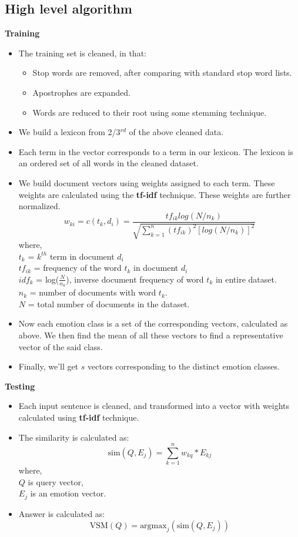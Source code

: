 \subsection{High level algorithm}
\label{subsec-high-level-alg}
\textbf{Training}
\begin{itemize}
\item The training set is cleaned, in that:
	\begin{itemize}
	\item Stop words are removed, after comparing with standard stop word lists.
	\item Apostrophes are expanded.
	\item Words are reduced to their root using some stemming technique.
	\end{itemize}
\item We build a lexicon from 2/3$^{rd}$ of the above cleaned data.
\item Each term in the vector corresponds to a term in our lexicon. The lexicon is an ordered set of all words in the cleaned dataset.
\item We build document vectors using weights assigned to each term. These weights are calculated using the \textbf{tf-idf} technique. These weights are further normalized.
$$
w_{ki}=c(t_k,d_i)=\frac{tf_{ik}log(N/n_k)}{\sqrt{\sum_{k=1}^{n} (tf_{ik})^{2}[log(N/n_k)]^2}}
$$
where, \\
$t_k$ = $k^{th}$ term in document $d_i$ \\
$tf_{ik}$ = frequency of the word $t_k$ in document $d_i$ \\
$idf_k$ = log($\frac{N}{n_k}$), inverse document frequency of word $t_k$ in  entire dataset. \\
$n_k$ = number of documents with word $t_k$. \\
$N$ = total number of documents in the dataset.
\item Now each emotion class is a set of the corresponding vectors, calculated as above. We then find the mean of all these vectors to find a representative vector of the said class.
\item Finally, we'll get $s$ vectors corresponding to the distinct emotion classes.
\end{itemize}
\textbf{Testing}
\begin{itemize}
\item Each input sentence is cleaned, and transformed into a vector with weights calculated using \textbf{tf-idf} technique.
\item The similarity is calculated as:
$$
\mbox{sim}(Q,E_j) = \sum_{k=1}^{n} w_{kq}*E_{kj}
$$
where,\\
$Q$ is query vector, \\
$E_j$ is an emotion vector.
\item Answer is calculated as:
$$
\mbox{VSM}(Q) = \mbox{argmax}_{j} (\mbox{sim}(Q, E_j))
$$
\end{itemize}

